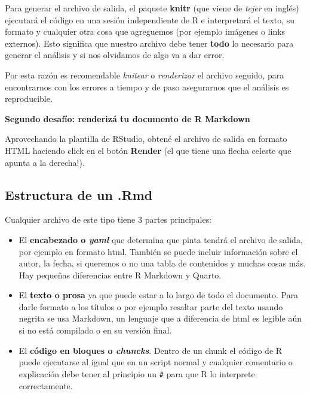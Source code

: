 \documentclass[
  letterpaper,
  DIV=11,
  numbers=noendperiod]{scrartcl}
\providecommand{\tightlist}{%
  \setlength{\itemsep}{0pt}\setlength{\parskip}{0pt}}\usepackage{longtable,booktabs,array}
\begin{document}
Para generar el archivo de salida, el paquete \textbf{knitr} (que viene
de \emph{tejer} en inglés) ejecutará el código en una sesión
independiente de R e interpretará el texto, su formato y cualquier otra
cosa que agreguemos (por ejemplo imágenes o links externos). Esto
significa que nuestro archivo debe tener \textbf{todo} lo necesario para
generar el análisis y si nos olvidamos de algo va a dar error.

Por esta razón es recomendable \emph{knitear} o \emph{renderizar} el
archivo seguido, para encontrarnos con los errores a tiempo y de paso
asegurarnos que el análisis es reproducible.

\begin{tcolorbox}[enhanced jigsaw, arc=.35mm, title=\textcolor{quarto-callout-tip-color}{\faLightbulb}\hspace{0.5em}{Ejercicio}, coltitle=black, bottomrule=.15mm, breakable, colbacktitle=quarto-callout-tip-color!10!white, bottomtitle=1mm, opacityback=0, toptitle=1mm, left=2mm, opacitybacktitle=0.6, rightrule=.15mm, toprule=.15mm, colback=white, colframe=quarto-callout-tip-color-frame, leftrule=.75mm, titlerule=0mm]
\textbf{Segundo desafío: renderizá tu documento de R Markdown}

Aprovechando la plantilla de RStudio, obtené el archivo de salida en
formato HTML haciendo click en el botón \textbf{Render} (el que tiene
una flecha celeste que apunta a la derecha!).
\end{tcolorbox}

\hypertarget{estructura-de-un-.rmd}{%
\subsection{Estructura de un .Rmd}\label{estructura-de-un-.rmd}}

Cualquier archivo de este tipo tiene 3 partes principales:

\begin{itemize}
\tightlist
\item
  El \textbf{encabezado o \emph{yaml}} que determina que pinta tendrá el
  archivo de salida, por ejemplo en formato html. También se puede
  incluir información sobre el autor, la fecha, si queremos o no una
  tabla de contenidos y muchas cosas más. Hay pequeñas diferencias entre
  R Markdown y Quarto.
\item
  El \textbf{texto o prosa} ya que puede estar a lo largo de todo el
  documento. Para darle formato a los títulos o por ejemplo resaltar
  parte del texto usando negrita se usa Markdown, un lenguaje que a
  diferencia de html es legible aún si no está compilado o en su versión
  final.
\item
  El \textbf{código en bloques o \emph{chuncks}}. Dentro de un chunk el
  código de R puede ejecutarse al igual que en un script normal y
  cualquier comentario o explicación debe tener al principio un
  \texttt{\#} para que R lo interprete correctamente.
\end{itemize}
\end{document}
